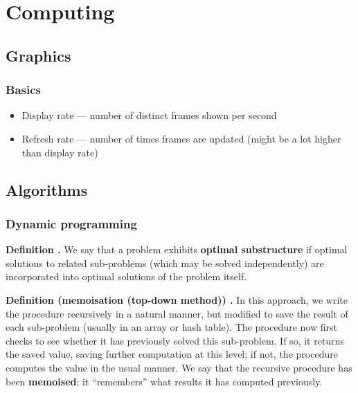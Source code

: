 \chapter{Computing}

\section{Graphics}

\subsection{Basics}

\begin{itemize}
	\item Display rate --- number of distinct frames shown per second
	\item Refresh rate --- number of times frames are updated (might be a lot higher than display rate)
\end{itemize}

\section{Algorithms}
\subsection{Dynamic programming}

\begin{shaded}
\textbf{Definition \cite{clrs_algorithms}.} We say that a problem exhibits \textbf{optimal substructure} if optimal solutions to related sub-problems (which may be solved independently) are incorporated into optimal solutions of the problem itself.
\end{shaded}

\begin{shaded}
\textbf{Definition (memoisation (top-down method)) \cite{clrs_algorithms}.} In this approach, we write the procedure recursively in a natural manner, but modified to save the result of each sub-problem (usually in an array or hash table). The procedure now first checks to see whether it has previously solved this sub-problem. If so, it returns the saved value, saving further computation at this level; if not, the procedure computes the value in the usual manner. We say that the recursive procedure has been \textbf{memoised}; it ``remembers'' what results it has computed previously.
\end{shaded}


